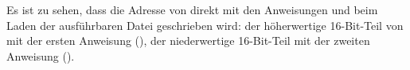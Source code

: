 Es ist zu sehen, dass die Adresse von  direkt mit den Anweisungen
 und  beim Laden der ausführbaren Datei geschrieben wird:
der höherwertige 16-Bit-Teil von  mit der ersten Anweisung (),
der niederwertige 16-Bit-Teil mit der zweiten Anweisung ().
